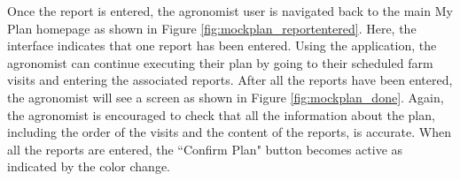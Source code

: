 \newpage
\noindent
Once the report is entered, the agronomist user is navigated back to the main My Plan homepage as shown in Figure \ref{fig:mockplan_reportentered}. Here, the interface indicates that one report has been entered. Using the application, the agronomist can continue executing their plan by going to their scheduled farm visits and entering the associated reports. After all the reports have been entered, the agronomist will see a screen as shown in Figure \ref{fig:mockplan_done}. Again, the agronomist is encouraged to check that all the information about the plan, including the order of the visits and the content of the reports, is accurate. When all the reports are entered, the “Confirm Plan" button becomes active as indicated by the color change. 

\begin{multicols}{2}


\end{multicols}
